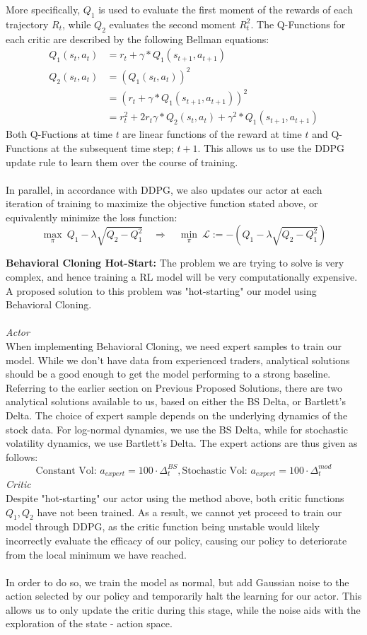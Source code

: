 \documentclass{article}
\begin{document}
More specifically, $Q_1$ is used to evaluate the first moment of the rewards of each trajectory $R_t$, while $Q_2$ evaluates the second moment $R_t^2$. The Q-Functions for each critic are described by the following Bellman equations:
\begin{align}
    Q_1(s_t, a_t)&=r_t+\gamma *Q_1(s_{t+1}, a_{t+1})\\
    Q_2(s_t,a_t) &= (Q_1(s_t, a_t))^2\\
    &= (r_t+\gamma *Q_1(s_{t+1}, a_{t+1}))^2\\
    &= r_t^2+2r_t\gamma*Q_2(s_t,a_t)+\gamma^2 *Q_1(s_{t+1}, a_{t+1})
\end{align}
Both Q-Fuctions at time $t$ are linear functions of the reward at time $t$ and Q-Functions at the subsequent time step; $t+1$. This allows us to use the DDPG update rule to learn them over the course of training.\\\\
In parallel, in accordance with DDPG, we also updates our actor at each iteration of training to maximize the objective function stated above, or equivalently minimize the loss function:
\[
\max_{\pi} \ Q_1 - \lambda \sqrt{Q_2-Q_1^2}  \quad \Rightarrow \quad \min_{\pi} \ \mathcal{L} := - \left(Q_1 - \lambda \sqrt{Q_2-Q_1^2}\right)
\]

\textbf{Behavioral Cloning Hot-Start:} The problem we are trying to solve is very complex, and hence training a RL model will be very computationally expensive. A proposed solution to this problem was "hot-starting" our model using Behavioral Cloning.\\\\
\textit{Actor}\\
When implementing Behavioral Cloning, we need expert samples to train our model. While we don't have data from experienced traders, analytical solutions should be a good enough to get the model performing to a strong baseline. Referring to the earlier section on Previous Proposed Solutions, there are two analytical solutions available to us, based on either the BS Delta, or Bartlett's Delta. The choice of expert sample depends on the underlying dynamics of the stock data. For log-normal dynamics, we use the BS Delta, while for stochastic volatility dynamics, we use Bartlett's Delta. The expert actions are thus given as follows:
\begin{equation}
    \text{Constant Vol: } a_{expert}=100\cdot \Delta^{BS}_t, \text{Stochastic Vol: }a_{expert} = 100\cdot\Delta_t^{mod}
\end{equation}
\textit{Critic}\\
Despite "hot-starting" our actor using the method above, both critic functions $Q_1, Q_2$ have not been trained. As a result, we cannot yet proceed to train our model through DDPG, as the critic function being unstable would likely incorrectly evaluate the efficacy of our policy, causing our policy to deteriorate from the local minimum we have reached.\\\\
In order to do so, we train the model as normal, but add Gaussian noise to the action selected by our policy and temporarily halt the learning for our actor. This allows us to only update the critic during this stage, while the noise aids with the exploration of the state - action space.
\end{document}
